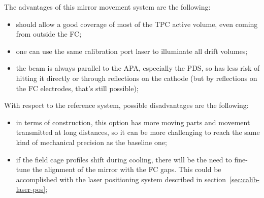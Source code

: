 The advantages of this mirror movement system are the following:
\begin{itemize}
\item should allow a good coverage of most of the TPC active volume, even coming from outside the FC;
\item one can use the same calibration port laser to illuminate all drift volumes;
\item the beam is always parallel to the APA, especially the PDS, so has less risk of hitting it directly or through reflections on the cathode (but by reflections on the FC electrodes, that's still possible);
% 
% 
\end{itemize}

With respect to the reference system, possible disadvantages are the following:
\begin{itemize}
\item in terms of construction, this option has more moving parts and movement transmitted at long distances, so it can be more challenging to reach the same kind of mechanical precision as the baseline one;
\item if the field cage profiles shift during cooling, there will be the need to fine-tune the alignment of the mirror with the FC gaps. This could be accomplished with the laser positioning system described in section~\ref{sec:calib-laser-pos};
 
\end{itemize}


\label{sec:sp-calib-sys-las-ion-meas}


